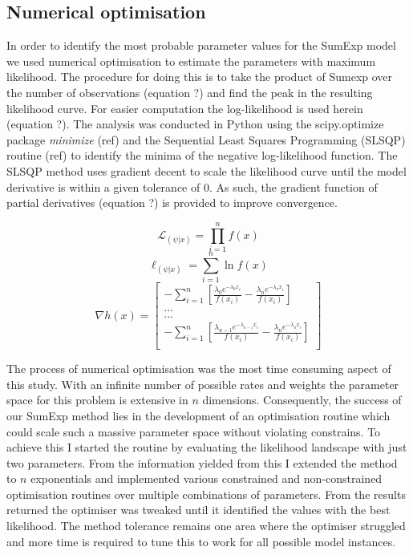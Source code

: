 \documentclass[11pt,usenames,dvipsnames,a4paper]{article}
\newcommand{\Lagr}{\mathcal{L}}
\begin{document}
\subsection{Numerical optimisation}

\begin{linenumbers}
\hspace{\parindent}
In order to identify the most probable parameter values for the SumExp model we used numerical optimisation to estimate the parameters with maximum likelihood. The procedure for doing this is to take the product of Sumexp over the number of observations (equation ?) and find the peak in the resulting likelihood curve. For easier computation the log-likelihood is used herein (equation ?). The analysis was conducted in Python using the scipy.optimize package \textit{minimize} (ref) and the Sequential Least Squares Programming (SLSQP) routine (ref) to identify the minima of the negative log-likelihood function. The SLSQP method uses gradient decent to scale the likelihood curve until the model derivative is within a given tolerance of 0. As such, the gradient function of partial derivatives (equation ?) is provided to improve convergence.
\end{linenumbers}
\begin{equation}
\Lagr_{(\psi|x)} = \prod_{i=1}^{n} f(x)
\end{equation} 
\begin{equation}
\ell_{(\psi|x)} = \sum_{i=1}^{n} \ln f(x)
\end{equation} 
\begin{equation}
\nabla h(x) = \begin{bmatrix} -\sum_{i=1}^{n} [\frac{\lambda_0 e^{-\lambda_0 x_i}}{f(x_i)} - \frac{\lambda_n e^{-\lambda_n x_i}}{f(x_i)}] \\
... \\
... \\
-\sum_{i=1}^{n} [\frac{\lambda_{n-1} e^{-\lambda_{n-1} x_i}}{f(x_i)} - \frac{\lambda_n e^{-\lambda_n x_i}}{f(x_i)}] \\
\end{bmatrix}
\end{equation}

The process of numerical optimisation was the most time consuming aspect of this study. With an infinite number of possible rates and weights the parameter space for this problem is extensive in $n$ dimensions. Consequently, the success of our SumExp method lies in the development of an optimisation routine which could scale such a massive parameter space without violating constrains. To achieve this I started the routine by evaluating the likelihood landscape with just two parameters. From the information yielded from this I extended the method to $n$ exponentials and implemented various constrained and non-constrained optimisation routines  over multiple combinations of parameters. From the results returned the optimiser was tweaked until it identified the values with the best likelihood. The method tolerance remains one area where the optimiser struggled and more time is required to tune this to work for all possible model instances.
\end{document}
